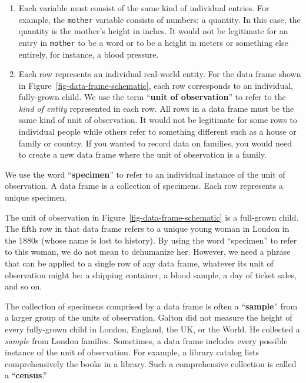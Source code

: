 \documentclass[
  letterpaper,
  DIV=11,
  numbers=noendperiod,
  oneside]{scrartcl}
\begin{document}
\begin{enumerate}
\def\labelenumi{\arabic{enumi}.}
\item
  Each variable must consist of the same kind of individual entries. For
  example, the \texttt{mother} variable consists of numbers: a quantity.
  In this case, the quantity is the mother's height in inches. It would
  not be legitimate for an entry in \texttt{mother} to be a word or to
  be a height in meters or something else entirely, for instance, a
  blood pressure.
\item
  Each row represents an individual real-world entity. For the data
  frame shown in Figure~\ref{fig-data-frame-schematic}, each row
  corresponds to an individual, fully-grown child. We use the term
  ``\textbf{unit of observation}'' to refer to the \emph{kind of entity}
  represented in each row. All rows in a data frame must be the same
  kind of unit of observation. It would not be legitimate for some rows
  to individual people while others refer to something different such as
  a house or family or country. If you wanted to record data on
  families, you would need to create a new data frame where the unit of
  observation is a family.
\end{enumerate}

We use the word ``\textbf{specimen}'' to refer to an individual instance
of the unit of observation. A data frame is a collection of specimens.
Each row represents a unique specimen.

The unit of observation in Figure~\ref{fig-data-frame-schematic} is a
full-grown child. The fifth row in that data frame refers to a unique
young woman in London in the 1880s (whose name is lost to history). By
using the word ``specimen'' to refer to this woman, we do not mean to
dehumanize her. However, we need a phrase that can be applied to a
single row of any data frame, whatever its unit of observation might be:
a shipping container, a blood sample, a day of ticket sales, and so on.

The collection of specimens comprised by a data frame is often a
``\textbf{sample}'' from a larger group of the units of observation.
Galton did not measure the height of every fully-grown child in London,
England, the UK, or the World. He collected a \emph{sample} from London
families. Sometimes, a data frame includes every possible instance of
the unit of observation. For example, a library catalog lists
comprehensively the books in a library. Such a comprehensive collection
is called a ``\textbf{census}.''
\end{document}
